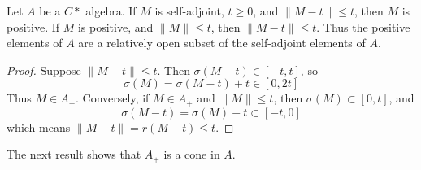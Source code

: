 
\begin{lemma}
    Let $A$ be a $C*$ algebra. If $M$ is self-adjoint, $t \geq 0$, and $\| M - t \| \leq t$, then $M$ is positive. If $M$ is positive, and $\| M \| \leq t$, then $\| M - t \| \leq t$. Thus the positive elements of $A$ are a relatively open subset of the self-adjoint elements of $A$.
\end{lemma}
\begin{proof}
    Suppose $\| M - t \| \leq t$. Then $\sigma(M - t) \in [-t,t]$, so
    \[ \sigma(M) = \sigma(M - t) + t \in [0, 2t] \]
    Thus $M \in A_+$. Conversely, if $M \in A_+$ and $\| M \| \leq t$, then $\sigma(M) \subset [0,t]$, and
    \[ \sigma(M - t) = \sigma(M) - t \subset [-t,0] \]
    which means $\| M - t \| = r(M - t) \leq t$.
\end{proof}

The next result shows that $A_+$ is a cone in $A$.

